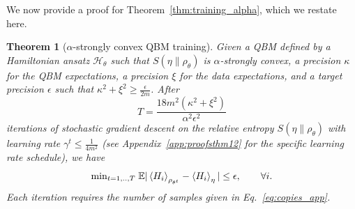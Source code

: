 \documentclass[
    aps,
    prx,
    onecolumn
]{revtex4-2}
\newtheorem{theorem}{Theorem}
\begin{document}
We now provide a proof for Theorem~\ref{thm:training_alpha}, which we restate here. 

\begingroup
\def\thetheorem{2}
\begin{theorem}[$\alpha$-strongly convex QBM training]
Given a QBM defined by a Hamiltonian ansatz $\mathcal{H}_\theta$ such that $S(\eta\|\rho_\theta)$ is $\alpha$-strongly convex, a precision $\kappa$ for the QBM expectations, a precision $\xi$ for the data expectations, and a target precision $\epsilon$ such that $\kappa^2 + \xi^2 \geq \frac{\epsilon}{2m}$. After
\begin{equation}
    T =\frac{18 m^2 (\kappa^2 + \xi^2)}{\alpha^2\epsilon^2}
\end{equation} 
iterations of stochastic gradient descent on the relative entropy $S(\eta \|\rho_\theta)$ with learning rate $\gamma^t \leq \frac{1}{4m^2}$ (see Appendix~\ref{app:proofsthm12} for the specific learning rate schedule), we have
\begin{equation}
    \mathrm{min}_{t=1,..,T} \; \mathbb{E}| \expval{H_i}_{\rho_{\theta^t}}  - \expval{H_i}_\eta | \leq \epsilon, \qquad \forall i.
\end{equation} 
Each iteration requires the number of samples given in Eq.~\eqref{eq:copies_app}. 
\end{theorem} 
\endgroup
\end{document}
